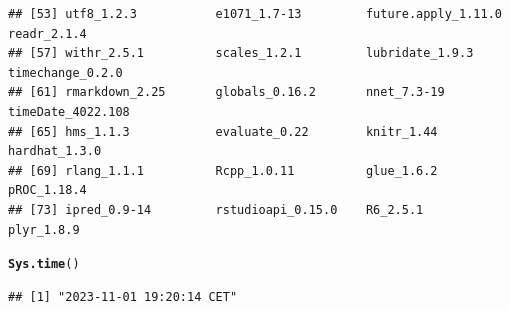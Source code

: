 \documentclass{article}\usepackage[]{graphicx}\usepackage[]{xcolor}
\makeatletter
\newcommand{\hlstd}[1]{\textcolor[rgb]{0.345,0.345,0.345}{#1}}%
\newcommand{\hlkwd}[1]{\textcolor[rgb]{0.737,0.353,0.396}{\textbf{#1}}}%
\newenvironment{kframe}{%
 \def\at@end@of@kframe{}%
 \ifinner\ifhmode%
  \def\at@end@of@kframe{\end{minipage}}%
  \begin{minipage}{\columnwidth}%
 \fi\fi%
 \def\FrameCommand##1{\hskip\@totalleftmargin \hskip-\fboxsep
 \colorbox{shadecolor}{##1}\hskip-\fboxsep
     \hskip-\linewidth \hskip-\@totalleftmargin \hskip\columnwidth}%
 \MakeFramed {\advance\hsize-\width
   \@totalleftmargin\z@ \linewidth\hsize
   \@setminipage}}%
 {\par\unskip\endMakeFramed%
 \at@end@of@kframe}
\newenvironment{knitrout}{}{} %
\makeatother
\begin{document}
\begin{knitrout}
\begin{kframe}
\begin{verbatim}
## [53] utf8_1.2.3           e1071_1.7-13         future.apply_1.11.0  readr_2.1.4         
## [57] withr_2.5.1          scales_1.2.1         lubridate_1.9.3      timechange_0.2.0    
## [61] rmarkdown_2.25       globals_0.16.2       nnet_7.3-19          timeDate_4022.108   
## [65] hms_1.1.3            evaluate_0.22        knitr_1.44           hardhat_1.3.0       
## [69] rlang_1.1.1          Rcpp_1.0.11          glue_1.6.2           pROC_1.18.4         
## [73] ipred_0.9-14         rstudioapi_0.15.0    R6_2.5.1             plyr_1.8.9
\end{verbatim}
\begin{alltt}
\hlkwd{Sys.time}\hlstd{()}
\end{alltt}
\begin{verbatim}
## [1] "2023-11-01 19:20:14 CET"
\end{verbatim}
\end{kframe}
\end{knitrout}
\end{document}
